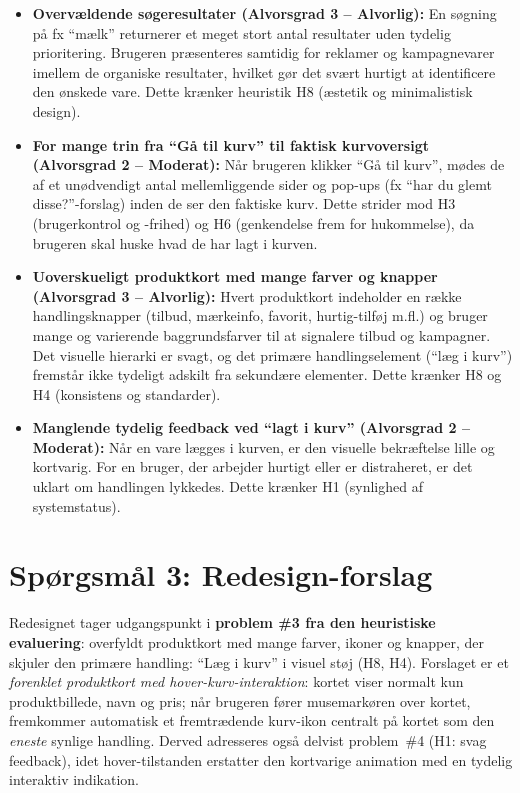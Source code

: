 \documentclass[12pt,a4paper]{article}
\begin{document}
\begin{itemize}[leftmargin=*,itemsep=0.3em]
  \item \textbf{Overvældende søgeresultater (Alvorsgrad 3 -- Alvorlig):} En søgning på fx
        ``mælk'' returnerer et meget stort antal resultater uden tydelig prioritering. Brugeren
        præsenteres samtidig for reklamer og kampagnevarer imellem de organiske resultater,
        hvilket gør det svært hurtigt at identificere den ønskede vare. Dette krænker heuristik
        H8 (æstetik og minimalistisk design).

  \item \textbf{For mange trin fra ``Gå til kurv'' til faktisk kurvoversigt (Alvorsgrad 2 --
        Moderat):} Når brugeren klikker ``Gå til kurv'', mødes de af et unødvendigt antal
        mellemliggende sider og pop-ups (fx ``har du glemt disse?''-forslag) inden de ser den
        faktiske kurv. Dette strider mod H3 (brugerkontrol og -frihed) og H6 (genkendelse frem
        for hukommelse), da brugeren skal huske hvad de har lagt i kurven.

  \item \textbf{Uoverskueligt produktkort med mange farver og knapper (Alvorsgrad 3 -- Alvorlig):}
        Hvert produktkort indeholder en række handlingsknapper (tilbud, mærkeinfo, favorit,
        hurtig-tilføj m.fl.) og bruger mange og varierende baggrundsfarver til at signalere
        tilbud og kampagner. Det visuelle hierarki er svagt, og det primære handlingselement
        (``læg i kurv'') fremstår ikke tydeligt adskilt fra sekundære elementer. Dette krænker
        H8 og H4 (konsistens og standarder).

  \item \textbf{Manglende tydelig feedback ved ``lagt i kurv'' (Alvorsgrad 2 -- Moderat):}
        Når en vare lægges i kurven, er den visuelle bekræftelse lille og kortvarig. For en
        bruger, der arbejder hurtigt eller er distraheret, er det uklart om handlingen lykkedes.
        Dette krænker H1 (synlighed af systemstatus).
\end{itemize}

\newpage
\section*{Spørgsmål 3: Redesign-forslag}

Redesignet tager udgangspunkt i \textbf{problem \#3 fra den heuristiske evaluering}: overfyldt produktkort med mange farver, ikoner og knapper, der skjuler den primære handling: ``Læg i kurv'' i visuel støj (H8, H4). Forslaget er et \emph{forenklet produktkort med
hover-kurv-interaktion}: kortet viser normalt kun produktbillede, navn og pris; når brugeren
fører musemarkøren over kortet, fremkommer automatisk et fremtrædende kurv-ikon centralt på
kortet som den \emph{eneste} synlige handling. Derved adresseres også delvist problem~\#4
(H1: svag feedback), idet hover-tilstanden erstatter den kortvarige animation med en tydelig
interaktiv indikation.
\end{document}
